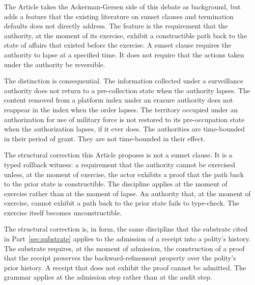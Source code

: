 The Article takes the Ackerman-Gersen side of this debate as background,
but adds a feature that the existing literature on sunset clauses and termination defaults does not directly address.
The feature is the requirement that the authority, at the moment of its exercise,
exhibit a constructible path back to the state of affairs that existed before the exercise.
A sunset clause requires the authority to lapse at a specified time.
It does not require that the actions taken under the authority be reversible.

The distinction is consequential.
The information collected under a surveillance authority does not return to a pre-collection state
when the authority lapses.
The content removed from a platform index under an erasure authority does not reappear in the index
when the order lapses.
The territory occupied under an authorization for use of military force is not restored to its
pre-occupation state when the authorization lapses, if it ever does.
The authorities are time-bounded in their period of grant.
They are not time-bounded in their effect.

The structural correction this Article proposes is not a sunset clause.
It is a typed rollback witness: a requirement that the authority cannot be exercised
unless, at the moment of exercise, the actor exhibits a proof that the path back to the prior state
is constructible.
The discipline applies at the moment of exercise rather than at the moment of lapse.
An authority that, at the moment of exercise, cannot exhibit a path back to the prior state
fails to type-check.
The exercise itself becomes unconstructible.

The structural correction is, in form, the same discipline that the substrate cited in
Part~\ref{sec:substrate} applies to the admission of a receipt into a polity's history.
The substrate requires, at the moment of admission, the construction of a proof that the receipt
preserves the backward-refinement property over the polity's prior history.
A receipt that does not exhibit the proof cannot be admitted.
The grammar applies at the admission step rather than at the audit step.

